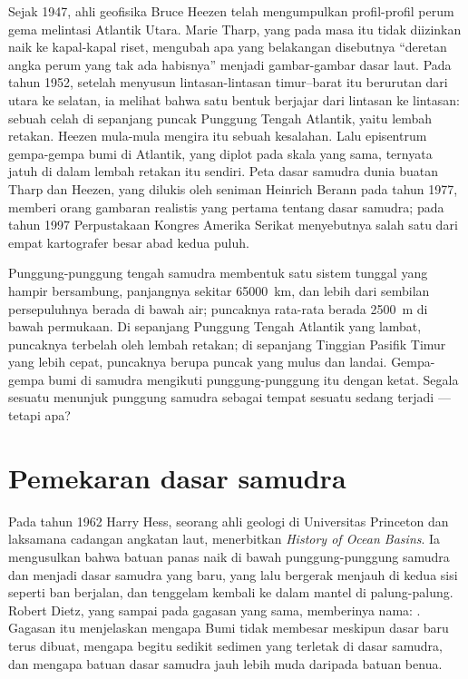\begin{history}
Sejak 1947, ahli geofisika Bruce Heezen telah mengumpulkan profil-profil perum
gema melintasi Atlantik Utara. Marie Tharp, yang pada masa itu tidak
diizinkan naik ke kapal-kapal riset, mengubah apa yang belakangan disebutnya
``deretan angka perum yang tak ada habisnya'' menjadi gambar-gambar dasar
laut. Pada tahun 1952, setelah menyusun lintasan-lintasan timur--barat itu
berurutan dari utara ke selatan, ia melihat bahwa satu bentuk berjajar dari
lintasan ke lintasan: sebuah celah di sepanjang puncak Punggung Tengah
Atlantik, yaitu lembah retakan. Heezen mula-mula mengira itu sebuah kesalahan.
Lalu episentrum gempa-gempa bumi di Atlantik, yang diplot pada skala yang
sama, ternyata jatuh di dalam lembah retakan itu sendiri. Peta dasar samudra
dunia buatan Tharp dan Heezen, yang dilukis oleh seniman Heinrich Berann pada
tahun 1977, memberi orang gambaran realistis yang pertama tentang dasar samudra;
pada tahun 1997 Perpustakaan Kongres Amerika Serikat menyebutnya salah satu dari empat
kartografer besar abad kedua puluh.
\end{history}

Punggung-punggung tengah samudra membentuk satu sistem tunggal yang hampir
bersambung, panjangnya sekitar \qty{65000}{km}, dan lebih dari sembilan
persepuluhnya berada di bawah air; puncaknya rata-rata berada \qty{2500}{m} di
bawah permukaan. Di sepanjang Punggung Tengah Atlantik yang lambat, puncaknya
terbelah oleh lembah retakan; di sepanjang Tinggian Pasifik Timur yang lebih
cepat, puncaknya berupa puncak yang mulus dan landai. Gempa-gempa bumi di
samudra mengikuti punggung-punggung itu dengan ketat. Segala sesuatu menunjuk
punggung samudra sebagai tempat sesuatu sedang terjadi --- tetapi apa?

\section{Pemekaran dasar samudra}

\begin{history}
Pada tahun 1962 Harry Hess, seorang ahli geologi di Universitas Princeton dan
laksamana cadangan angkatan laut, menerbitkan \emph{History of Ocean Basins}.
Ia mengusulkan bahwa batuan panas naik di bawah punggung-punggung samudra dan
menjadi dasar samudra yang baru, yang lalu bergerak menjauh di kedua sisi
seperti ban berjalan, dan tenggelam kembali ke dalam mantel di palung-palung.
Robert Dietz, yang sampai pada gagasan yang sama, memberinya nama: . Gagasan itu menjelaskan mengapa Bumi tidak membesar meskipun
dasar baru terus dibuat, mengapa begitu sedikit sedimen yang terletak di dasar
samudra, dan mengapa batuan dasar samudra jauh lebih muda daripada batuan
benua.
\end{history}


